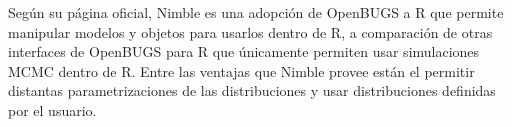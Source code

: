 \documentclass{article}
\begin{document}
\begin{enumerate}
    Según su página oficial, Nimble es una adopción de OpenBUGS a R que permite
    manipular modelos y objetos para usarlos dentro de R, a comparación de otras
    interfaces de OpenBUGS para R que únicamente permiten usar simulaciones MCMC
    dentro de R. Entre las ventajas que Nimble provee están el permitir distantas 
    parametrizaciones de las distribuciones y usar distribuciones definidas por
    el usuario.




   
\end{enumerate}




 
\end{document}

